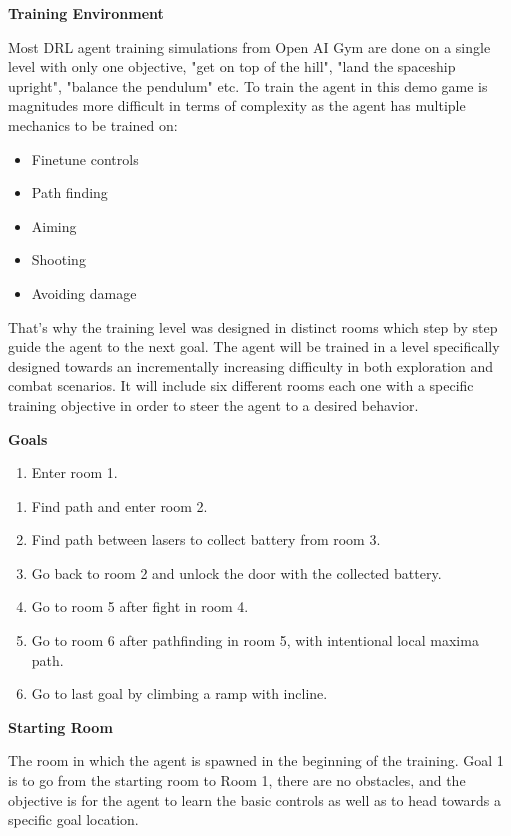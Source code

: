 \documentclass[a4paper,one side,12pt]{book}
\begin{document}
\textbf{Training Environment}

Most DRL agent training simulations from Open AI Gym are done on a
single level with only one objective, "get on top of the hill", "land
the spaceship upright", "balance the pendulum" etc. To train the
agent in this demo game is magnitudes more difficult in terms of
complexity as the agent has multiple mechanics to be trained on:

\begin{itemize}
\item
  Finetune controls
\item
  Path finding
\item
  Aiming
\item
  Shooting
\item
  Avoiding damage
\end{itemize}

That's why the training level was designed in distinct rooms which step
by step guide the agent to the next goal. The agent will be trained in a
level specifically designed towards an incrementally increasing
difficulty in both exploration and combat scenarios. It will include six
different rooms each one with a specific training objective in order to
steer the agent to a desired behavior.

\textbf{Goals}

\begin{enumerate}
\def\labelenumi{\arabic{enumi}.}
\item
  Enter room 1.
\end{enumerate}

\begin{enumerate}
\def\labelenumi{\arabic{enumi}.}
\item
  Find path and enter room 2.
\item
  Find path between lasers to collect battery from room 3.
\item
  Go back to room 2 and unlock the door with the collected battery.
\item
  Go to room 5 after fight in room 4.
\item
  Go to room 6 after pathfinding in room 5, with intentional local maxima path.
\item 
  Go to last goal by climbing a ramp with incline.
\end{enumerate}

\textbf{Starting Room}

The room in which the agent is spawned in the beginning of the training.
Goal 1 is to go from the starting room to Room 1, there are no
obstacles, and the objective is for the agent to learn the basic
controls as well as to head towards a specific goal location.
\end{document}
